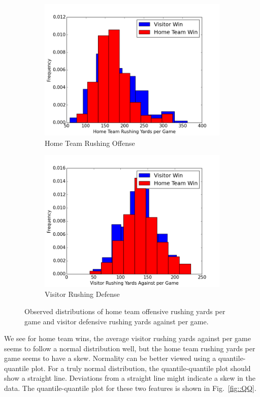 \documentclass[12pt]{article}
\begin{document}
\begin{figure}[ht!]
	\centering
	\begin{subfigure}{.5\textwidth}
		\centering
		\includegraphics[width=.9\linewidth]{figs/homeRushOff.png}
		\caption{Home Team Rushing Offense}
		\label{fig::homeRushOff}
	\end{subfigure}%
	\begin{subfigure}{.5\textwidth}
		\centering
		\includegraphics[width=.9\linewidth]{figs/visitorRushDef.png}
		\caption{Visitor Rushing Defense}
		\label{fig::visitorRushDef}
	\end{subfigure}
	\caption{Observed distributions of home team offensive rushing yards per game and visitor defensive rushing yards against per game.}
	\label{fig::features_hist}
\end{figure}

We see for home team wins, the average visitor rushing yards against per game seems to follow a normal distribution well, but the home team rushing yards per game seems to have a skew. Normality can be better viewed using a quantile-quantile plot. For a truly normal distribution, the quantile-quantile plot should show a straight line. Deviations from a straight line might indicate a skew in the data. The quantile-quantile plot for these two features is shown in Fig.~\ref{fig::QQ}.
\end{document}

